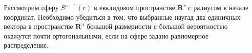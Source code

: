 \begin{problem}

Рассмотрим сферу $S^{n-1}(r)$ в евклидовом пространстве $\mathbf{R}^r$ с радиусом в начале координат. Необходимо убедиться в том, что выбранные наугад два единичных вектора в пространстве $\mathbf{R}^n$ большой размерности с большой вероятностью окажутся почти ортогональными, если на сфере задано равномерное распределение.  
\end{problem}


